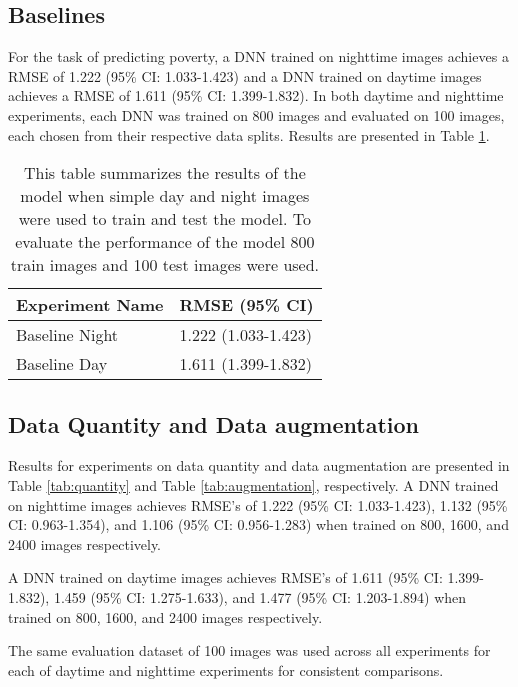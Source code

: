\documentclass{article}
\begin{document}
\subsection{Baselines}
For the task of predicting poverty, a DNN trained on nighttime images achieves a RMSE of 1.222 (95\% CI: 1.033-1.423) and a DNN trained on daytime images achieves a RMSE of 1.611 (95\% CI: 1.399-1.832). In both daytime and nighttime experiments, each DNN was trained on 800 images and evaluated on 100 images, each chosen from their respective data splits. Results are presented in Table \ref{tab:baseline}.


\begin{table}[]
\centering
\begin{tabular}{@{}ll@{}}
\toprule
Experiment Name & RMSE (95\% CI)                \\ \midrule
Baseline Night  & 1.222 (1.033-1.423)           \\
Baseline Day    & 1.611 (1.399-1.832)           \\ \bottomrule
\end{tabular}
\caption{This table summarizes the results of the model when simple day and night images were used to train and test the model. To evaluate the performance of the model 800 train images and 100 test images were used.}
\label{tab:baseline}
\end{table}


\subsection{Data Quantity and Data augmentation}
Results for experiments on data quantity and data augmentation are presented in Table \ref{tab:quantity} and Table \ref{tab:augmentation}, respectively. A DNN trained on nighttime images achieves RMSE's of 1.222 (95\% CI: 1.033-1.423), 1.132 (95\% CI: 0.963-1.354), and 1.106 (95\% CI: 0.956-1.283) when trained on 800, 1600, and 2400 images respectively.

A DNN trained on daytime images achieves RMSE's of 1.611 (95\% CI: 1.399-1.832), 1.459 (95\% CI: 1.275-1.633), and 1.477 (95\% CI: 1.203-1.894) when trained on 800, 1600, and 2400 images respectively. 

The same evaluation dataset of 100 images was used across all experiments for each of daytime and nighttime experiments for consistent comparisons.
\end{document}
